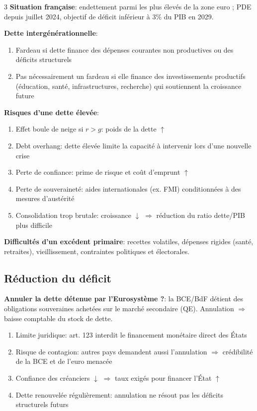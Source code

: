 \documentclass[12pt, a4paper]{article}
\begin{document}
\begin{multicols*}{3}
\textbf{Situation française}: endettement parmi les plus élevés de la zone euro ; PDE depuis juillet 2024, objectif de déficit inférieur à $3\%$ du PIB en 2029.

\textbf{Dette intergénérationnelle}:
\begin{enumerate}[\roman*.]
  \item Fardeau si dette finance des dépenses courantes non productives ou des déficits structurels
  \item Pas nécessairement un fardeau si elle finance des investissements productifs (éducation, santé, infrastructures, recherche) qui soutiennent la croissance future
\end{enumerate}

\colbreak
\textbf{Risques d'une dette élevée}:
\begin{enumerate}[\roman*.]
  \item Effet boule de neige si $r>g$: poids de la dette $\uparrow$
  \item Debt overhang: dette élevée limite la capacité à intervenir lors d'une nouvelle crise
  \item Perte de confiance: prime de risque et coût d'emprunt $\uparrow$
  \item Perte de souveraineté: aides internationales (ex. FMI) conditionnées à des mesures d'austérité
  \item Consolidation trop brutale: croissance $\downarrow$ $\Rightarrow$ réduction du ratio dette/PIB plus difficile
\end{enumerate}

\textbf{Difficultés d'un excédent primaire}: recettes volatiles, dépenses rigides (santé, retraites), vieillissement, contraintes politiques et électorales.

\subsection{Réduction du déficit}

\textbf{Annuler la dette détenue par l'Eurosystème ?}: la BCE/BdF détient des obligations souveraines achetées sur le marché secondaire (QE). Annulation $\Rightarrow$ baisse comptable du stock de dette.
\begin{enumerate}[\roman*.]
  \item Limite juridique: art. 123 interdit le financement monétaire direct des États
  \item Risque de contagion: autres pays demandent aussi l'annulation $\Rightarrow$ crédibilité de la BCE et de l'euro menacée
  \item Confiance des créanciers $\downarrow$ $\Rightarrow$ taux exigés pour financer l'État $\uparrow$
  \item Dette renouvelée régulièrement: annulation ne résout pas les déficits structurels futurs
\end{enumerate}


\end{multicols*}
\end{document}
